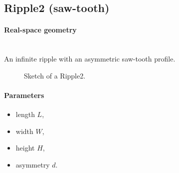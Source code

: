 \newpage
\subsection{Ripple2 (saw-tooth)}   

\paragraph{Real-space geometry}\strut\\
An infinite ripple with an asymmetric saw-tooth profile.

\begin{figure}[ht]
\hfill
{}
\hfill
{}
\hfill
\caption{Sketch of a Ripple2.}
\label{fig:ripple2}
\end{figure}

\FloatBarrier

\paragraph{Parameters}
\begin{itemize}
\item length $L$, 
\item width $W$, 
\item height $H$,
\item asymmetry $d$. 
\end{itemize}

